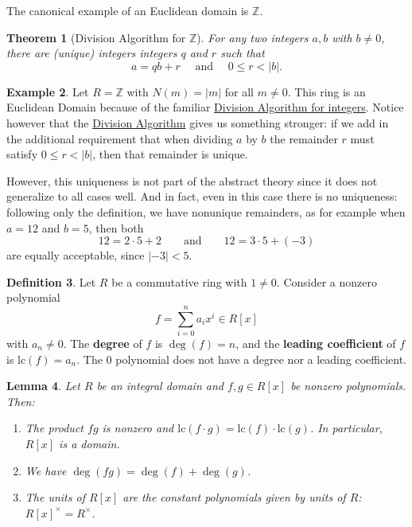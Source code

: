 \documentclass[12pt]{report}
\newtheorem{theorem}{Theorem}[chapter]
\newtheorem{lemma}[theorem]{Lemma}
\numberwithin{equation}{section}
\numberwithin{theorem}{chapter}
\theoremstyle{definition}
\newtheorem{definition}[theorem]{Definition}
\newtheorem{example}[theorem]{Example}
\newtheorem*{basic properties}{Basic Properties}
\newtheorem*{Important Remark}{Important Remark}
\newcommand{\df}[1]{{\bf #1}\index{#1}}
\begin{document}
The canonical example of an Euclidean domain is $\mathbb{Z}$.


\begin{theorem}[Division Algorithm for $\mathbb{Z}$]\label{division algorithm integers}
	For any two integers $a, b$ with $b \neq 0$, there are (unique) integers integers $q$ and $r$ such that 
$$a = qb + r \quad \text{ and } \quad 0 \leqslant r < |b|.$$
\end{theorem}


\begin{example}\label{Z is an euclidean domain}
Let $R = \mathbb{Z}$ with $N(m) = |m|$ for all $m \neq 0$. This ring is an Euclidean Domain because of the familiar \hyperref[division algorithm integers]{Division Algorithm for integers}. Notice however that the \hyperref[division algorithm integers]{Division Algorithm} gives us something stronger: if we add in the additional requirement that when dividing $a$ by $b$ the remainder $r$ must satisfy $0 \leqslant r < |b|$, then that remainder is unique. 

However, this uniqueness is not part of the abstract theory since it does not generalize to all cases well. And in fact, even in this case there is no uniqueness: following only the definition, we have nonunique remainders, as for example when $a = 12$ and $b = 5$, then both
$$12 = 2 \cdot 5 + 2 \qquad \text{and} \qquad 12 = 3 \cdot 5 + (-3)$$
are equally acceptable, since $|-3| < 5$. 
\end{example}



\begin{definition}
Let $R$ be a commutative ring with $1 \neq 0$. Consider a nonzero polynomial 
$$f = \sum_{i=0}^n a_i x^i\in R[x]$$ 
with $a_n \neq 0$.
The {\bf degree} of $f$ is $\deg(f) = n$, and the \df{leading coefficient} of $f$ is $\mathrm{lc}(f) = a_n$. The $0$ polynomial does not have a degree nor a leading coefficient.
\end{definition}



\begin{lemma}\label{degree of products of polynomials over domains}
Let $R$ be an integral domain and $f, g \in R[x]$ be nonzero polynomials. Then:
\begin{enumerate}[itemsep=-0.1em,leftmargin=20pt]
\vspace{-0.5em}
\item The product $fg$ is nonzero and $\mathrm{lc}(f \cdot g) = \mathrm{lc}(f) \cdot \mathrm{lc}(g)$.
In particular, $R[x]$ is a domain.
\item We have $\deg(f g)=\deg(f)+\deg(g)$.
\item The units of $R[x]$ are the constant polynomials given by units of $R$: $R[x]^\times=R^\times$.
\end{enumerate}
\end{lemma}
\end{document}
